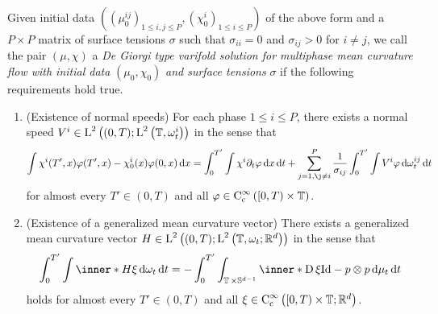 \begin{definition}
	Given initial data 
	$ (
		( \mu_{ 0 }^{ i j } )_{ 1 \leq i , j \leq P },
		( \chi^{ i}_{ 0 } )_{ 1 \leq i \leq P}
	) $
	of the above form and a $ P \times P $ matrix of surface tensions $ \sigma 
	$ such that $ \sigma_{ i i }=0 $ and $ \sigma_{ i j } > 0 $ for $ i \neq j 
	$, we call the pair $ \left( \mu , \chi \right) $ a
	\emph{De Giorgi type varifold solution for multiphase mean curvature flow 
	with initial data} $ ( \mu_{ 0 } , \chi_{ 0 } ) $ \emph{and surface 
	tensions} $ \sigma $ if the following requirements hold true.
	\begin{enumerate}
		\item (Existence of normal speeds)
		For each phase $ 1 \leq i \leq P $, there exists a normal speed
		$ V^{ i } \in \operatorname{L}^{ 2 } \left(
			( 0 , T ) ;
			\operatorname{L}^{ 2 } \left( \operatorname{\mathbb{T}} , \omega_{ t }^{ i } \right)
		\right) $ in the sense that
		\begin{equation}
			\label{equation_varifold_velocity_multiphase}
			\int
				\chi^{ i } ( T', x ) \varphi ( T', x ) 
				-
				\chi^{ i }_{ 0 } ( x ) \varphi ( 0 , x )
			\dd{ x }
			=
			\int_{ 0 }^{ T' }
				\int
					\chi^{ i }
					\partial_{ t } \varphi
				\dd{ x }
			\dd{ t }
			+
			\sum_{ j =1, \j \neq i  }^{ P }
				\frac{ 1 }{ \sigma_{ i j } }
				\int_{ 0 }^{ T' }
					\int
						V^{ i }
						\varphi
					\dd{ \omega_{ t }^{ i j } }
				\dd{ t }
		\end{equation}
		for almost every $ T' \in ( 0 , T ) $ and all $ \varphi \in \operatorname{C}_{ 
		\mathrm{c} }^{ \infty } \left( [ 0 , T ) \times \operatorname{\mathbb{T}}\right) 
		$.
		
	\item (Existence of a generalized mean curvature vector)
	There exists a generalized mean curvature vector 
	$ H \in \operatorname{L}^{ 2 } \left(
		( 0 , T ) ;
		\operatorname{L}^{ 2 } \left( \operatorname{\mathbb{T}} , \omega_{ t } ; \mathbb{ R }^{ d } \right)
	\right) $
	in the sense that
	\begin{equation}
		\label{equation_varifold_mean_curvature_multiphase}
		\int_{ 0 }^{ T' }
			\int
				\inner*{ H }{ \xi }
			\dd{ \omega_{ t } }
		\dd{ t }
		=
		-
		\int_{ 0 }^{ T' }
			\int_{ \flattorus \times \mathbb{ S }^{ d - 1 } }
				\inner*{ \diff \xi }
				{ \mathrm{Id} - p \otimes p }
			\dd{ \mu_{ t } }
		\dd{ t }
	\end{equation}
	holds for almost every $ T' \in ( 0 , T ) $ and all $ \xi \in \operatorname{C}_{ 
	\mathrm{c} }^{ \infty } \left( [ 0 , T ) \times \operatorname{\mathbb{T}} ; \mathbb{ 
	R }^{ d } \right) $.
	

\end{enumerate}
\end{definition}
